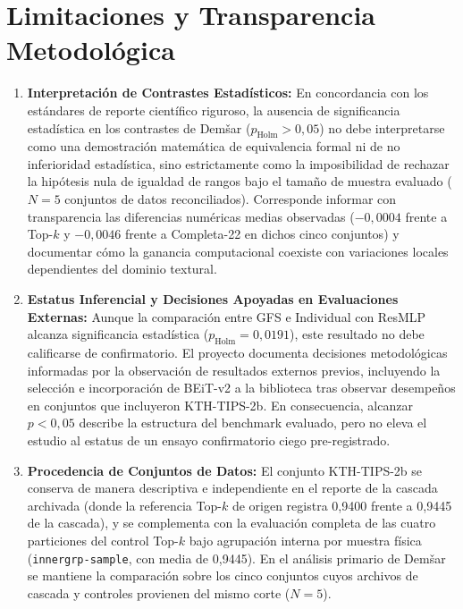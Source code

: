 \section{Limitaciones y Transparencia Metodológica}

\begin{enumerate}
\item \textbf{Interpretación de Contrastes Estadísticos:} En concordancia con los estándares de reporte científico riguroso, la ausencia de significancia estadística en los contrastes de Demšar ($p_{\text{Holm}} > 0{,}05$) no debe interpretarse como una demostración matemática de equivalencia formal ni de no inferioridad estadística, sino estrictamente como la imposibilidad de rechazar la hipótesis nula de igualdad de rangos bajo el tamaño de muestra evaluado ($N=5$ conjuntos de datos reconciliados). Corresponde informar con transparencia las diferencias numéricas medias observadas ($-0{,}0004$ frente a Top-$k$ y $-0{,}0046$ frente a Completa-22 en dichos cinco conjuntos) y documentar cómo la ganancia computacional coexiste con variaciones locales dependientes del dominio textural.
\item \textbf{Estatus Inferencial y Decisiones Apoyadas en Evaluaciones Externas:} Aunque la comparación entre GFS e Individual con ResMLP alcanza significancia estadística ($p_{\text{Holm}}=0{,}0191$), este resultado no debe calificarse de confirmatorio. El proyecto documenta decisiones metodológicas informadas por la observación de resultados externos previos, incluyendo la selección e incorporación de BEiT-v2 a la biblioteca tras observar desempeños en conjuntos que incluyeron KTH-TIPS-2b. En consecuencia, alcanzar $p<0{,}05$ describe la estructura del benchmark evaluado, pero no eleva el estudio al estatus de un ensayo confirmatorio ciego pre-registrado.
\item \textbf{Procedencia de Conjuntos de Datos:} El conjunto KTH-TIPS-2b se conserva de manera descriptiva e independiente en el reporte de la cascada archivada (donde la referencia Top-$k$ de origen registra 0{,}9400 frente a 0{,}9445 de la cascada), y se complementa con la evaluación completa de las cuatro particiones del control Top-$k$ bajo agrupación interna por muestra física (\texttt{innergrp-sample}, con media de 0{,}9445). En el análisis primario de Demšar se mantiene la comparación sobre los cinco conjuntos cuyos archivos de cascada y controles provienen del mismo corte ($N=5$).

\end{enumerate}
